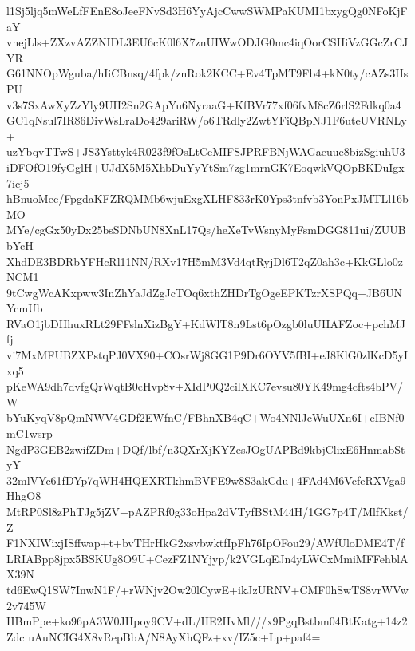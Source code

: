 l1Sj5ljq5mWeLfFEnE8oJeeFNvSd3H6YyAjcCwwSWMPaKUMI1bxygQg0NFoKjFaY
vnejLls+ZXzvAZZNIDL3EU6cK0l6X7znUIWwODJG0mc4iqOorCSHiVzGGcZrCJYR
G61NNOpWguba/hIiCBnsq/4fpk/znRok2KCC+Ev4TpMT9Fb4+kN0ty/cAZs3HsPU
v3s7SxAwXyZzYly9UH2Sn2GApYu6NyraaG+KfBVr77xf06fvM8cZ6rlS2Fdkq0a4
GC1qNsul7IR86DivWsLraDo429ariRW/o6TRdly2ZwtYFiQBpNJ1F6uteUVRNLy+
uzYbqvTTwS+JS3Ysttyk4R023f9fOsLtCeMIFSJPRFBNjWAGaeuue8bizSgiuhU3
iDFOfO19fyGglH+UJdX5M5XhbDuYyYtSm7zg1mrnGK7EoqwkVQOpBKDuIgx7icj5
hBnuoMec/FpgdaKFZRQMMb6wjuExgXLHF833rK0Yps3tnfvb3YonPxJMTLl16bMO
MYe/cgGx50yDx25bsSDNbUN8XnL17Qs/heXeTvWsnyMyFsmDGG811ui/ZUUBbYcH
XhdDE3BDRbYFHcRl11NN/RXv17H5mM3Vd4qtRyjDl6T2qZ0ah3c+KkGLlo0zNCM1
9tCwgWcAKxpww3InZhYaJdZgJcTOq6xthZHDrTgOgeEPKTzrXSPQq+JB6UNYcmUb
RVaO1jbDHhuxRLt29FFslnXizBgY+KdWlT8n9Lst6pOzgb0luUHAFZoc+pchMJfj
vi7MxMFUBZXPstqPJ0VX90+COsrWj8GG1P9Dr6OYV5fBI+eJ8KlG0zlKcD5yIxq5
pKeWA9dh7dvfgQrWqtB0cHvp8v+XIdP0Q2cilXKC7evsu80YK49mg4cfts4bPV/W
bYuKyqV8pQmNWV4GDf2EWfnC/FBhnXB4qC+Wo4NNlJcWuUXn6I+eIBNf0mC1wsrp
NgdP3GEB2zwifZDm+DQf/lbf/n3QXrXjKYZesJOgUAPBd9kbjClixE6HnmabStyY
32mlVYc61fDYp7qWH4HQEXRTkhmBVFE9w8S3akCdu+4FAd4M6VcfeRXVga9HhgO8
MtRP0Sl8zPhTJg5jZV+pAZPRf0g33oHpa2dVTyfBStM44H/1GG7p4T/MlfKkst/Z
F1NXIWixjISffwap+t+bvTHrHkG2xsvbwktfIpFh76IpOFou29/AWfUloDME4T/f
LRIABpp8jpx5BSKUg8O9U+CezFZ1NYjyp/k2VGLqEJn4yLWCxMmiMFFehblAX39N
td6EwQ1SW7InwN1F/+rWNjv2Ow20lCywE+ikJzURNV+CMF0hSwTS8vrWVw2v745W
HBmPpe+ko96pA3W0JHpoy9CV+dL/HE2HvMl///x9PgqBstbm04BtKatg+14z2Zdc
uAuNCIG4X8vRepBbA/N8AyXhQFz+xv/IZ5c+Lp+paf4=
